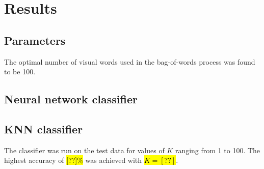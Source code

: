 \section{Results}

\subsection{Parameters}
The optimal number of visual words used in the bag-of-words process was found to be 100.


\subsection{Neural network classifier}

\subsection{KNN classifier}
The classifier was run on the test data for values of $K$ ranging from 1 to 100.
The highest accuracy of \hl{[??]\%} was achieved with \hl{$K = [??]$}.	%


